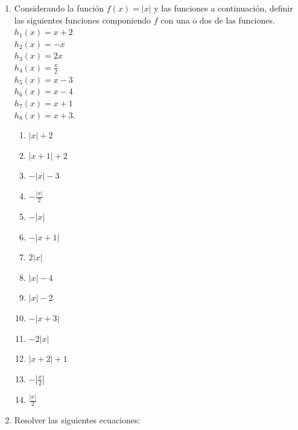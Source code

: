 \documentclass[a4paper]{article}
\newcommand{\exercise}{\item}
\begin{document}
\begin{enumerate}
	\begin{enumerate} [label=(\alph*)]
		\item $(x+2)^2$
		\item $-x^2$
		\item $x^2+2$
		\item $2x^2$
		\item $\left(\displaystyle\frac{x}{2}\right)^2$
		\item $\displaystyle\frac{x^2}{2}$
		\item $(x-3)^2-1$
		\item $(x-1)^2-3$
		\item $(x-1)^2-1$
	\end{enumerate}
	\exercise Considerando la función $f(x)=|x|$ y las funciones a continuación, definir las siguientes funciones componiendo $f$ con una o dos de las funciones. \\ $h_1(x)=x+2$ \\ $h_2(x)=-x$ \\ $h_3(x)=2x$ \\ $h_4(x)=\displaystyle\frac{x}{2}$ \\ $h_5(x)=x-3$ \\ $h_6(x)=x-4$ \\ $h_7(x)=x+1$ \\ $h_8(x)=x+3$.
	\begin{enumerate} [label=(\alph*)]
		\item $|x|+2$
		\item $|x+1|+2$
		\item $-|x|-3$
		\item $-\displaystyle\frac{|x|}{2}$
		\item $-|x|$
		\item $-|x+1|$
		\item $2|x|$
		\item $|x|-4$
		\item $|x|-2$
		\item $-|x+3|$
		\item $-2|x|$
		\item $|x+2|+1$
		\item $-\left|\displaystyle\frac{x}{2}\right|$
		\item $\displaystyle\frac{|x|}{2}$
	\end{enumerate}
	\exercise Resolver las siguientes ecuaciones:

\end{enumerate}
\end{document}
